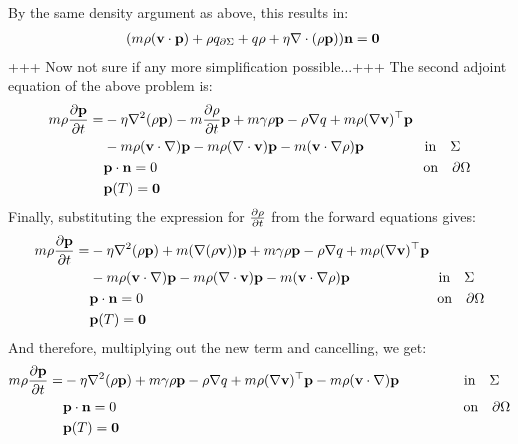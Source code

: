 By the same density argument as above, this results in:
\begin{align*}
&(  m \rho (\mathbf{v} \cdot \mathbf{p})+\rho  {q}_{\partial \Sigma} + q \rho + \eta\nabla \cdot(\rho \mathbf{p})) \mathbf{n} =\mathbf{0}
\end{align*}
+++ Now not sure if any more simplification possible...+++
The second adjoint equation of the above problem is:
\begin{align*}
  m\rho \frac{\partial \mathbf{p}}{\partial t} =& - \eta \nabla^2 (\rho \mathbf{p}) - m \frac{\partial \rho}{\partial t} \mathbf{p}   +m \gamma \rho \mathbf{p}-\rho\nabla q +m \rho (\nabla \mathbf{v})^\top\mathbf{p} \\
&-m \rho (\mathbf{v} \cdot \nabla)\mathbf{p} - m \rho (\nabla \cdot \mathbf{v})\mathbf{p}  - m (\mathbf{v} \cdot \nabla \rho)\mathbf{p}  \ \qquad\qquad \text{in} \quad \Sigma\\
&\mathbf{p} \cdot \mathbf{n} = 0 \qquad \qquad \qquad \qquad \qquad \qquad \qquad \qquad \qquad \quad \text{on} \quad \partial \Omega \\
&\mathbf{p}(T)=\mathbf{0}
\end{align*}
Finally, substituting the expression for $\frac{\partial \rho}{\partial t} $ from the forward equations gives:
\begin{align*}
m\rho \frac{\partial \mathbf{p}}{\partial t} =& - \eta \nabla^2 (\rho \mathbf{p}) + m (\nabla(\rho \mathbf{v}))\mathbf{p}   +m \gamma \rho \mathbf{p}-\rho\nabla q +m \rho (\nabla \mathbf{v})^\top\mathbf{p} \\
&-m \rho (\mathbf{v} \cdot \nabla)\mathbf{p} - m \rho (\nabla \cdot \mathbf{v})\mathbf{p}  - m (\mathbf{v} \cdot \nabla \rho)\mathbf{p}  \ \qquad\qquad \qquad \text{in} \quad \Sigma\\
&\mathbf{p} \cdot \mathbf{n} = 0 \qquad \qquad \qquad \qquad \qquad \qquad \qquad \qquad \qquad \qquad \quad \text{on} \quad \partial \Omega \\
&\mathbf{p}(T)=\mathbf{0}
\end{align*}
And therefore, multiplying out the new term and cancelling, we get:
\begin{align*}
m\rho \frac{\partial \mathbf{p}}{\partial t} =& - \eta \nabla^2 (\rho \mathbf{p})   +m \gamma \rho \mathbf{p}-\rho\nabla q +m \rho (\nabla \mathbf{v})^\top\mathbf{p} -m \rho (\mathbf{v} \cdot \nabla)\mathbf{p}   \ \qquad\qquad \  \text{in} \quad \Sigma\\
&\mathbf{p} \cdot \mathbf{n} = 0 \qquad \qquad \qquad \qquad \qquad \qquad \qquad \qquad \qquad \qquad \qquad \qquad \quad \text{on} \quad \partial \Omega \\
&\mathbf{p}(T)=\mathbf{0}
\end{align*}
